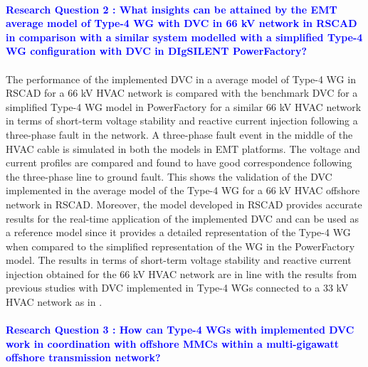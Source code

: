\paragraph{\textcolor{blue}{Research Question 2 : What insights can be attained by the \gls{EMT} average model of Type-4 \gls{WG} with \gls{DVC} in 66 kV network in RSCAD in comparison with a similar system modelled with a simplified Type-4 \gls{WG} configuration with \gls{DVC} in DIgSILENT PowerFactory?}}

\paragraph{} The performance of the implemented \gls{DVC} in a average model of Type-4 \gls{WG} in RSCAD for a 66 kV \gls{HVAC} network is compared with the benchmark \gls{DVC} for a simplified Type-4 \gls{WG} model in PowerFactory for a similar 66 kV \gls{HVAC} network in terms of short-term voltage stability and reactive current injection following a three-phase fault in the network. A three-phase fault event in the middle of the \gls{HVAC} cable is simulated in both the models in \gls{EMT} platforms. The voltage and current profiles are compared and found to have good correspondence following the three-phase line to ground fault. This shows the validation of the \gls{DVC} implemented in the average model of the Type-4 \gls{WG} for a 66 kV \gls{HVAC} offshore network in RSCAD. Moreover, the model developed in RSCAD provides accurate results for the real-time application of the implemented \gls{DVC} and can be used as a reference model since it provides a detailed representation of the Type-4 \gls{WG} when compared to the simplified representation of the \gls{WG} in the PowerFactory model. The results in terms of short-term voltage stability and reactive current injection obtained for the 66 kV \gls{HVAC} network are in line with the results from previous studies with \gls{DVC} implemented in Type-4 \gls{WG}s connected to a 33 kV \gls{HVAC} network as in \cite{korai_dynamic_2019}.    

\paragraph{\textcolor{blue}{Research Question 3 : How can Type-4 \gls{WG}s with implemented \gls{DVC} work in coordination with offshore \gls{MMC}s within a multi-gigawatt offshore transmission network?}}

